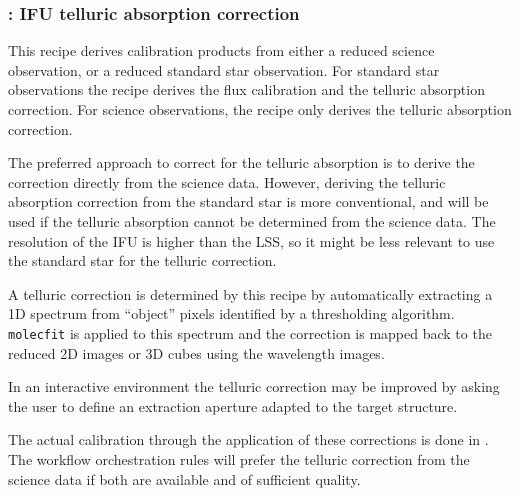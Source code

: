 \clearpage
\subsubsection{: IFU telluric absorption correction}
\label{sssec:ifu_telluric}
\label{rec:metis_ifu_telluric}

This recipe derives calibration products from either a reduced science
observation, or a reduced standard star observation.
For standard star observations the recipe derives the flux calibration and the
telluric absorption correction.
For science observations, the recipe only derives the telluric absorption
correction.

The preferred approach to correct for the telluric absorption is to derive the
correction directly from the science data.
However, deriving the telluric absorption correction from the standard star
is more conventional, and will be used if the telluric absorption cannot be
determined from the science data.
The resolution of the \ac{IFU} is higher than the \ac{LSS}, so it might be less
relevant to use the standard star for the telluric correction.

A telluric correction is determined by this recipe by automatically
extracting a 1D spectrum from ``object'' pixels identified by a
thresholding algorithm. \lstinline{molecfit} is applied to this
spectrum and the correction is mapped back to the reduced 2D images or
3D cubes using the wavelength images.

In an interactive environment the telluric correction may be improved by asking
the user to define an extraction aperture adapted to the target
structure.


The actual calibration through the application of these corrections is done in .
The workflow orchestration rules will prefer the telluric correction from the
science data if both are available and of sufficient quality.

